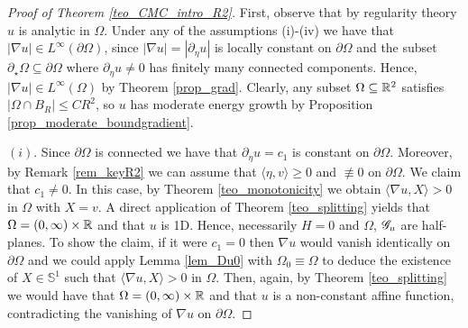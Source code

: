 \documentclass[10 pt,a4paper]{article}
\theoremstyle{definition}
\begin{document}
\begin{proof}[Proof of Theorem \ref{teo_CMC_intro_R2}]
	First, observe that by regularity theory $u$ is analytic in $\Omega$. Under any of the assumptions (i)-(iv) we have that $|\nabla u| \in L^\infty(\partial\Omega)$, since $|\nabla u| = |\partial_\eta u|$ is locally constant on $\partial\Omega$ and the subset $\partial_\star \Omega \subseteq \partial\Omega$ where $\partial_\eta u\neq 0$ has finitely many connected components. Hence, $|\nabla u| \in L^\infty(\Omega)$ by Theorem \ref{prop_grad}. Clearly, any subset $\Omega \subseteq \mathbb R^2$ satisfies $|\Omega \cap B_R| \le CR^2$, so $u$ has moderate energy growth by Proposition \ref{prop_moderate_boundgradient}.
	
	$(i)$. Since $\partial\Omega$ is connected we have that $\partial_\eta u = c_1$ is constant on $\partial\Omega$. Moreover, by Remark \ref{rem_keyR2} we can assume that $\langle \eta, v \rangle \ge 0$ and $\not \equiv 0$ on $\partial \Omega$. We claim that $c_1\neq 0$. In this case, by Theorem \ref{teo_monotonicity} we obtain $\langle \nabla u, X \rangle > 0$ in $\Omega$ with $X = v$. A direct application of Theorem \ref{teo_splitting} yields that $\Omega = (0,\infty) \times \mathbb R$ and that $u$ is 1D. Hence, necessarily $H=0$ and $\Omega$, $\mathscr{G}_u$ are half-planes. To show the claim, if it were $c_1 = 0$ then $\nabla u$ would vanish identically on $\partial\Omega$ and we could apply Lemma \ref{lem_Du0} with $\Omega_0 \equiv \Omega$ to deduce the existence of $X \in \mathbb{S}^1$ such that $\langle \nabla u, X \rangle >0$ in $\Omega$. Then, again, by Theorem \ref{teo_splitting} we would have that $\Omega = (0,\infty) \times \mathbb R$ and that $u$ is a non-constant affine function, contradicting the vanishing of $\nabla u$ on $\partial\Omega$.
	

\end{proof}
\end{document}
